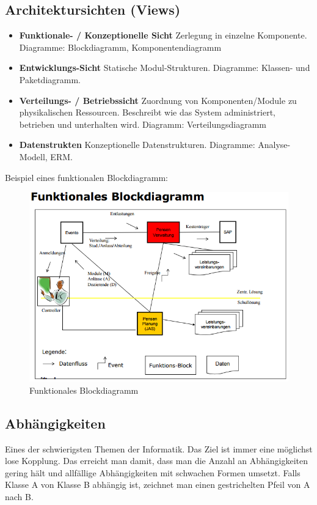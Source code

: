 \subsection{Architektursichten (Views)}
\begin{itemize}
	\item \textbf{Funktionale- / Konzeptionelle Sicht} Zerlegung in einzelne Komponente. Diagramme: Blockdiagramm, Komponentendiagramm 
	\item \textbf{Entwicklungs-Sicht} Statische Modul-Strukturen. Diagramme: Klassen- und Paketdiagramm. 
	\item \textbf{Verteilungs- / Betriebssicht} Zuordnung von Komponenten/Module zu physikalischen Ressourcen. Beschreibt wie das System administriert, betrieben und unterhalten wird. Diagramm: Verteilungsdiagramm
	\item \textbf{Datenstrukten} Konzeptionelle Datenstrukturen. Diagramme: Analyse-Modell, ERM. 
\end{itemize}

Beispiel eines funktionalen Blockdiagramm:
\begin{figure}[h!]
\centering
\includegraphics[width=0.8\linewidth]{fig/funktionales-blockdiagramm}
\caption{Funktionales Blockdiagramm}
\label{fig:funktionales-blockdiagramm}
\end{figure}

\subsection{Abhängigkeiten}
Eines der schwierigsten Themen der Informatik. Das Ziel ist immer eine möglichst lose Kopplung. Das erreicht man damit, dass man die Anzahl an Abhängigkeiten gering hält und allfällige Abhängigkeiten mit schwachen Formen umsetzt. Falls Klasse A von Klasse B abhängig ist, zeichnet man einen gestrichelten Pfeil von A nach B.

